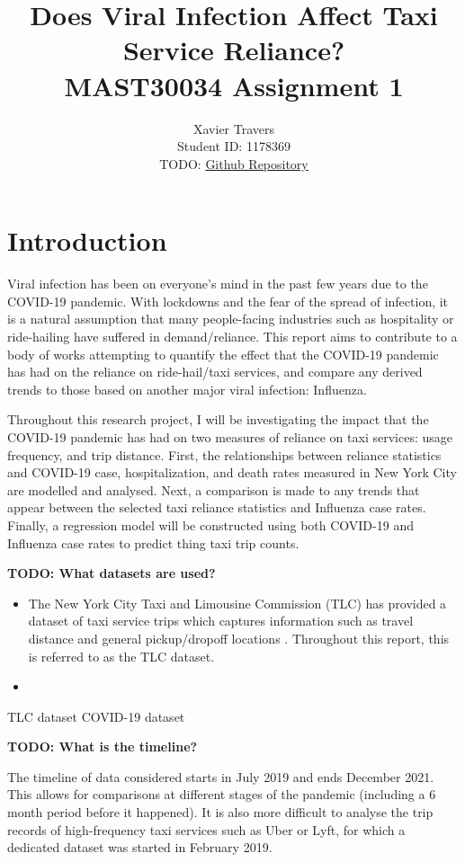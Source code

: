 \documentclass[11pt]{article}
\title{\textbf{Does Viral Infection Affect Taxi Service Reliance?} \\ 
MAST30034 Assignment 1}
\author{
Xavier Travers \\
Student ID: 1178369 \\
TODO: \href{https://github.com/MAST30034-Applied-Data-Science/mast30034\_p1\_template/tree/fd9f1dd17fdbcb5b119b70c93a22da8210d44fd7}{Github Repository}
}
\begin{document}
\maketitle

\section{Introduction}

Viral infection has been on everyone's mind in the past few years due to the COVID-19 pandemic.
With lockdowns and the fear of the spread of infection, 
it is a natural assumption that many people-facing industries such as hospitality or ride-hailing have suffered in demand/reliance.
This report aims to contribute to a body of works attempting to quantify the effect that the COVID-19 pandemic has had on the reliance on ride-hail/taxi services,
and compare any derived trends to those based on another major viral infection: Influenza.

Throughout this research project, 
I will be investigating the impact that the COVID-19 pandemic has had on two measures of reliance on taxi services:
usage frequency, and trip distance. 
First, the relationships between reliance statistics and COVID-19 case, hospitalization, and death rates measured in New York City are modelled and analysed.
Next, a comparison is made to any trends that appear between the selected taxi reliance statistics and Influenza case rates.
Finally, a regression model will be constructed using both COVID-19 and Influenza case rates to predict thing taxi trip counts.

\textbf{TODO: What datasets are used?}

\begin{itemize}
    \item The New York City Taxi and Limousine Commission (TLC) has provided a dataset of taxi service trips which captures information such as travel distance and general pickup/dropoff locations \cite{tlcdataset}. 
Throughout this report, this is referred to as the TLC dataset. 
    \item 
\end{itemize}
TLC dataset \cite{tlcdataset}
COVID-19 dataset

\textbf{TODO: What is the timeline?}

The timeline of data considered starts in July 2019 and ends December 2021.
This allows for comparisons at different stages of the pandemic (including a 6 month period before it happened).
It is also more difficult to analyse the trip records of high-frequency taxi services such as Uber or Lyft,
for which a dedicated dataset was started in February 2019.
\end{document}
